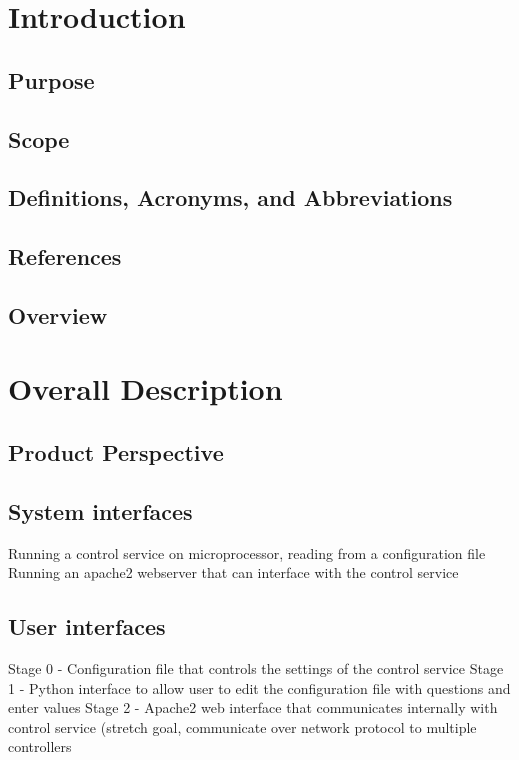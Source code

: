 \documentclass[onecolumn, draftclsnofoot,10pt, compsoc]{IEEEtran}
\begin{document}
	\section*{Introduction}

		\subsection*{Purpose}
		

		\subsection*{Scope}


		\subsection*{Definitions, Acronyms, and Abbreviations}

		\subsection*{References}


		\subsection*{Overview}


	\section*{Overall Description}

		\subsection*{Product Perspective}

			\subsection*{System interfaces}
			Running a control service on microprocessor, reading from a configuration file
			Running an apache2 webserver that can interface with the control service


			\subsection*{User interfaces}
			Stage 0 - Configuration file that controls the settings of the control service
			Stage 1 - Python interface to allow user to edit the configuration file with questions and enter values
			Stage 2 - Apache2 web interface that communicates internally with control service (stretch goal, communicate over network protocol to multiple controllers
\end{document}
